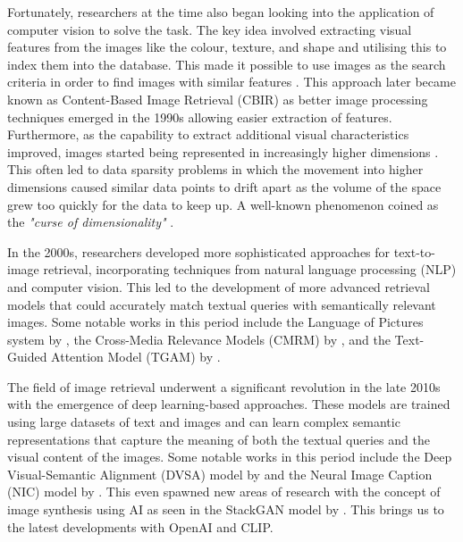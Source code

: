 \documentclass{l4proj}
\begin{document}
Fortunately, researchers at the time also began looking into the application of computer vision to solve the task. The key idea involved extracting visual features from the images like the colour, texture, and shape and utilising this to index them into the database. This made it possible to use images as the search criteria in order to find images with similar features \citep{chang1981pictorial}. This approach later became known as Content-Based Image Retrieval (CBIR) as better image processing techniques emerged in the 1990s allowing easier extraction of features. Furthermore, as the capability to extract additional visual characteristics improved, images started being represented in increasingly higher dimensions \citep{zheng2017sift}. This often led to data sparsity problems in which the movement into higher dimensions caused similar data points to drift apart as the volume of the space grew too quickly for the data to keep up. A well-known phenomenon coined as the \emph{"curse of dimensionality"} \citep{bellman1957dp}.

In the 2000s, researchers developed more sophisticated approaches for text-to-image retrieval, incorporating techniques from natural language processing (NLP) and computer vision. This led to the development of more advanced retrieval models that could accurately match textual queries with semantically relevant images. Some notable works in this period include the Language of Pictures system by \cite{lavrenko2003lop}, the Cross-Media Relevance Models (CMRM) by \cite{rasiwasia2010cmmr}, and the Text-Guided Attention Model (TGAM) by \cite{gao2018tgam}.

The field of image retrieval underwent a significant revolution in the late 2010s with the emergence of deep learning-based approaches. These models are trained using large datasets of text and images and can learn complex semantic representations that capture the meaning of both the textual queries and the visual content of the images. Some notable works in this period include the Deep Visual-Semantic Alignment (DVSA) model by \cite{karpathy2015dvsa} and the Neural Image Caption (NIC) model by \cite{vinyals2015nic}. This even spawned new areas of research with the concept of image synthesis using AI as seen in the StackGAN model by \cite{zhang2017stackgan}. This brings us to the latest developments with OpenAI and CLIP.
\end{document}
